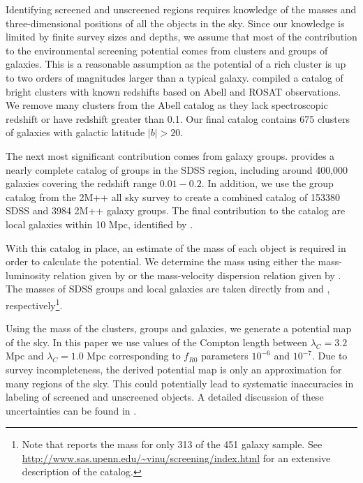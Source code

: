 \documentclass[twocolappendix, numberedappendix]{emulateapj}
\begin{document}
Identifying screened and unscreened regions requires knowledge of the masses and
three-dimensional positions of all the objects in the sky.
Since our knowledge is limited by finite survey sizes and depths,
we assume that most of the contribution to the environmental screening
potential comes from
clusters and groups of galaxies. This is a reasonable assumption as the
potential of a rich cluster is up to 
two orders of magnitudes larger than a typical galaxy. \citet{cabre2012}
compiled a catalog of bright clusters with known redshifts based on 
Abell \citep{abe89} and ROSAT \citep{ebe96} observations. We remove many
clusters from the Abell catalog as they lack spectroscopic
redshift or have redshift greater than 0.1. Our final catalog contains 675
clusters of galaxies with galactic latitude $\left|b\right| > 20$.

The next most significant contribution comes from galaxy groups.
\citet{yan07} provides a nearly complete catalog of groups in the SDSS region,
including around 400,000 galaxies
covering the redshift range $0.01-0.2$.
In addition, we use the group catalog from the 2M++ all
sky survey \citep{lav011} to create a combined catalog of
153380 SDSS and 3984 2M++ galaxy groups.
The final contribution to the catalog are
local galaxies within 10 Mpc, identified by \citet{kar04}. 

With this catalog in place, an estimate of the mass of each object
is required in order to calculate the potential.
We determine the mass using either the mass-luminosity relation given by
\citet{rei02} or the mass-velocity dispersion relation given by \citet{evr08}.
The masses of SDSS groups and local galaxies are taken directly from
\citet{yan07} and \citet{kar04}, respectively\footnote{Note
that \citet{kar04} reports the mass for only 313 of the 451 galaxy sample.
See \url{http://www.sas.upenn.edu/~vinu/screening/index.html}
for an extensive
description of the catalog.}.

Using the mass of the clusters, groups and galaxies, we generate a
potential map of the sky.
In this paper we use values of the Compton length between $\lambda_C
= 3.2$ Mpc and  $\lambda_C = 1.0$ Mpc corresponding to $f_{R0}$ parameters
$10^{-6}$ and $10^{-7}$.  
Due to survey incompleteness, the derived potential map
is only an approximation for many regions of the sky. This could potentially
lead to systematic inaccuracies in labeling of screened and unscreened objects.
A detailed discussion of these uncertainties can be found in \citet{cabre2012}. 
 
\end{document}
